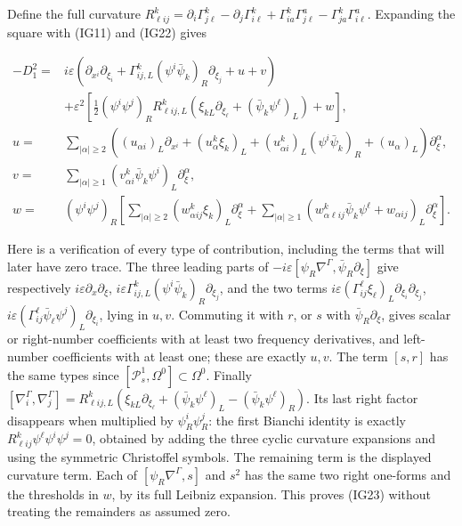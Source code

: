 \documentclass[
  11pt,
]{article}
\begin{document}
Define the full curvature
\(R^k_{\ell ij}=\partial_i\Gamma^k_{j\ell}-\partial_j\Gamma^k_{i\ell}+\Gamma^k_{ia}\Gamma^a_{j\ell}-\Gamma^k_{ja}\Gamma^a_{i\ell}\).
Expanding the square with (IG11) and (IG22) gives

\[
\begin{split}
 -D_1^2={}&i\varepsilon\left(
 \partial_{x^i}\partial_{\xi_i}
 +\Gamma^k_{ij,L}(\psi^i\bar\psi_k)_R\partial_{\xi_j}
 +u+v\right)\\
 &+\varepsilon^2\left[
 \frac12(\psi^i\psi^j)_R R^k_{\ell ij,L}
       \left(\xi_{kL}\partial_{\xi_\ell}
                    +(\bar\psi_k\psi^\ell)_L\right)+w\right],\\
 u={}&\sum_{|\alpha|\geq2}
   \left((u_{\alpha i})_L\partial_{x^i}
       +(u^k_\alpha\xi_k)_L
       +(u^k_{\alpha i})_L(\psi^i\bar\psi_k)_R
       +(u_\alpha)_L\right)\partial_\xi^\alpha,\\
 v={}&\sum_{|\alpha|\geq1}
          (v^k_{\alpha i}\bar\psi_k\psi^i)_L\partial_\xi^\alpha,\\
 w={}&(\psi^i\psi^j)_R\left[
     \sum_{|\alpha|\geq2}(w^k_{\alpha ij}\xi_k)_L\partial_\xi^\alpha
    +\sum_{|\alpha|\geq1}
      (w^k_{\alpha\ell ij}\bar\psi_k\psi^\ell+w_{\alpha ij})_L
                                     \partial_\xi^\alpha\right].
\end{split}
\tag{IG23}
\]

Here is a verification of every type of contribution, including the
terms that will later have zero trace. The three leading parts of
\(-i\varepsilon[\psi_R\nabla^\Gamma,\bar\psi_R\partial_\xi]\) give
respectively \(i\varepsilon\partial_x\partial_\xi\),
\(i\varepsilon\Gamma^k_{ij,L}(\psi^i\bar\psi_k)_R\partial_{\xi_j}\), and
the two terms
\(i\varepsilon(\Gamma^\ell_{ij}\xi_\ell)_L\partial_{\xi_i}\partial_{\xi_j}\),
\(i\varepsilon(\Gamma^\ell_{ij}\bar\psi_\ell\psi^j)_L\partial_{\xi_i}\),
lying in \(u,v\). Commuting it with \(r\), or \(s\) with
\(\bar\psi_R\partial_\xi\), gives scalar or right-number coefficients
with at least two frequency derivatives, and left-number coefficients
with at least one; these are exactly \(u,v\). The term \([s,r]\) has the
same types since \([\mathcal P_s^1,\Omega^0]\subset\Omega^0\). Finally
\([\nabla_i^\Gamma,\nabla_j^\Gamma]=R^k_{\ell ij,L}(\xi_{kL}\partial_{\xi_\ell}+(\bar\psi_k\psi^\ell)_L-(\bar\psi_k\psi^\ell)_R)\).
Its last right factor disappears when multiplied by
\(\psi_R^i\psi_R^j\): the first Bianchi identity is exactly
\(R^k_{\ell ij}\psi^\ell\psi^i\psi^j=0\), obtained by adding the three
cyclic curvature expansions and using the symmetric Christoffel symbols.
The remaining term is the displayed curvature term. Each of
\([\psi_R\nabla^\Gamma,s]\) and \(s^2\) has the same two right one-forms
and the thresholds in \(w\), by its full Leibniz expansion. This proves
(IG23) without treating the remainders as assumed zero.
\end{document}
